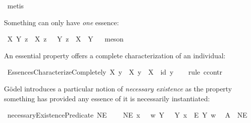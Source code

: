 \begin{isabellebody}
\ metis%
%
%
%
\begin{isamarkuptext}%
Something can only have \emph{one} essence:%
\end{isamarkuptext}\isamarkuptrue%
\isamarkupfalse%
\ {\isachardoublequoteopen}{\isasymlfloor}\isactrlbold {\isasymforall}X\ Y\ z{\isachardot}\ {\isacharparenleft}{\isasymE}\ X\ z\ \isactrlbold {\isasymand}\ {\isasymE}\ Y\ z{\isacharparenright}\ \isactrlbold {\isasymrightarrow}\ {\isacharparenleft}X\ {\isasymRrightarrow}\ Y{\isacharparenright}{\isasymrfloor}{\isachardoublequoteclose}%
\ %
%
\isamarkupfalse%
\ meson%
%
%
%
\begin{isamarkuptext}%
An essential property offers a complete characterization of an individual:%
\end{isamarkuptext}\isamarkuptrue%
\isamarkupfalse%
\ EssencesCharacterizeCompletely{\isacharcolon}\ {\isachardoublequoteopen}{\isasymlfloor}\isactrlbold {\isasymforall}X\ y{\isachardot}\ {\isasymE}\ X\ y\ \isactrlbold {\isasymrightarrow}\ {\isacharparenleft}X\ {\isasymRrightarrow}\ {\isacharparenleft}id\ y{\isacharparenright}{\isacharparenright}{\isasymrfloor}{\isachardoublequoteclose}\isanewline
%
\ \ %
%
\isamarkupfalse%
\ {\isacharparenleft}rule\ ccontr{\isacharparenright}\ %
%
%
%
%
\begin{isamarkuptext}%
G\"odel introduces a particular notion of \emph{necessary existence} as the property something has
 provided any essence of it is necessarily instantiated:%
\end{isamarkuptext}\isamarkuptrue%
\isamarkupfalse%
\ necessaryExistencePredicate{\isacharcolon}{\isacharcolon}{\isachardoublequoteopen}{\isasymup}{\isasymlangle}{\isasymzero}{\isasymrangle}{\isachardoublequoteclose}\ {\isacharparenleft}{\isachardoublequoteopen}NE{\isachardoublequoteclose}{\isacharparenright}\ \isanewline
\ \ \ {\isachardoublequoteopen}NE\ x\ \ {\isasymequiv}\ {\isacharparenleft}{\isasymlambda}w{\isachardot}\ {\isacharparenleft}\isactrlbold {\isasymforall}Y{\isachardot}\ \ {\isasymE}\ Y\ x\ \isactrlbold {\isasymrightarrow}\ \isactrlbold {\isasymbox}\isactrlbold {\isasymexists}\isactrlsup E\ Y{\isacharparenright}\ w{\isacharparenright}{\isachardoublequoteclose}\isanewline
\isanewline
{}\isamarkupfalse%
\ \ A{}{\isacharcolon}\ {\isachardoublequoteopen}{\isasymlfloor}{\isasymP}\ NE{\isasymrfloor}{\isachardoublequoteclose}\ %

\end{isabellebody}
